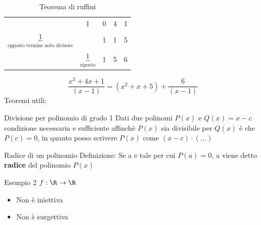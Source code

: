 \begin{table}[H]
	\centering
	\caption{Teorema di ruffini}
	\begin{tabular}{c|ccc|c}
		                                                          & 1                                   & 0 & 4 & 1 \\
		$ \underbrace{1}_{\text{opposto termine noto divisore}} $ &                                     & 1 & 1 & 5 \\
		\hline
		                                                          & $ \underbrace{1}_{\text{riporto}} $ & 1 & 5 & 6 \\
	\end{tabular}
\end{table}
\[
	\frac{x^3 + 4x + 1}{\left( x-1 \right)} = \left( x^2 + x + 5 \right) +\frac{6}{\left( x-1 \right)}
\]
Teoremi utili:
\begin{teorema}{Divisione per polinomio di grado 1
	}
	Dati due polinomi $P\left( x \right)  \text{ e  }Q\left( x \right) = x-c$ condizione necessaria e sufficiente affinchè $P\left( x \right) $ sia divisibile per $Q\left( x \right)$ è che $P\left( c \right) =0$, in quanto posso scrivere $P\left( x \right) $ come $\left( x-c \right) \cdot\left( \ldots \right) $

\end{teorema}
\begin{definizione}{Radice di un polinomio}
	Definizione: Se a e tale per cui $ P\left( a \right) =0$, a viene detto \textbf{radice} del polinomio $P\left( x \right) $
\end{definizione}

\begin{minipage}[t]{0.48\textwidth}
	Esempio 2 $f : \R \rightarrow \R $
	\begin{center}
	\end{center}
	\begin{itemize}
		\item Non è iniettiva
		\item Non è surgettiva
	\end{itemize}

\end{minipage}

